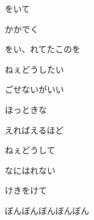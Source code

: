 \documentclass[a4paper,tate,twocolumn,12pt]{ltjtarticle}
\begin{document}
\begin{flushleft}
\begin{minipage}{\linewidth}
をいて

かかでく
\end{minipage}

\vspace{2em}

\noindent\begin{minipage}{\linewidth}
をい、れてたこのを

ねぇどうしたい

ごせないがいい

ほっときな

えればえるほど

ねぇどうして

なにはれない

けきをけて

ぼんぼんぼんぼんぼん
\end{minipage}

\end{flushleft}
\end{document}
